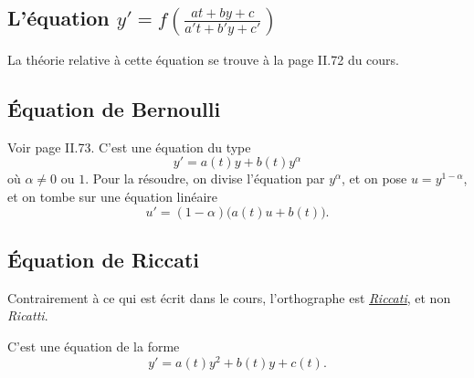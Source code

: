 					\subsection{L'équation \texorpdfstring{$y'=f\left( \frac{ at+by+c }{ a't+b'y+c' } \right)$}{yat}}

La théorie relative à cette équation se trouve à la page II.72 du cours.

					\subsection{Équation de Bernoulli}
\label{SubSecBernh}

Voir page II.73. C'est une équation du type
\begin{equation}	\label{EqBerNDiffalp}
	y'=a(t)y+b(t)y^{\alpha}
\end{equation}
où $\alpha\neq 0$ ou $1$. Pour la résoudre, on divise l'équation par $y^{\alpha}$, et on pose $u=y^{1-\alpha}$, et on tombe sur une équation linéaire
\begin{equation}
	u'=(1-\alpha)\big( a(t)u+b(t) \big).
\end{equation}


					\subsection{Équation de Riccati}
\label{SubSecRicatti}

Contrairement à ce qui est écrit dans le cours, l'orthographe est \emph{\href{http://fr.wikipedia.org/wiki/Jacopo_Riccati}{Riccati}}, et non \emph{Ricatti}.

C'est une équation de la forme 
\begin{equation}		\label{EqDiffGFeneRicatti}
	y'=a(t)y^2+b(t)y+c(t).
\end{equation}

